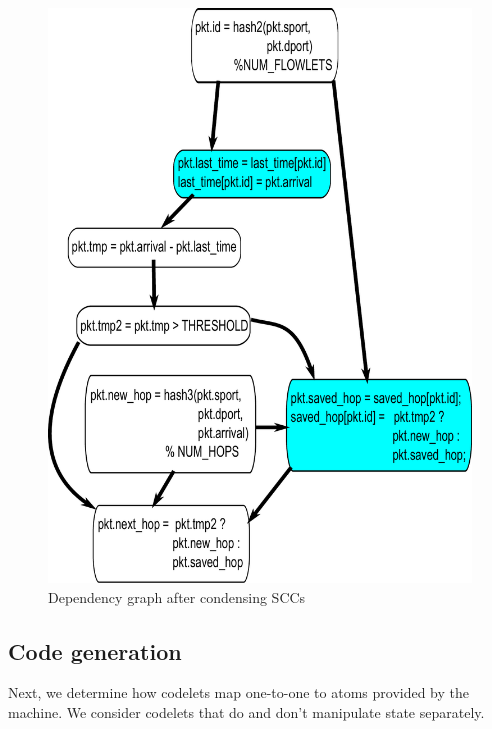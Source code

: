 \begin{figure}[!t]
\begin{minipage}{0.5\textwidth}
\end{minipage}
%
\vrule\quad
%
\begin{minipage}{0.5\textwidth}
\includegraphics[width=\columnwidth]{scc.pdf}
\caption{Dependency graph after condensing SCCs}
\label{fig:partitioning_after}
\end{minipage}
\end{figure}

\subsection{Code generation}
\label{ss:code_gen}
Next, we determine how codelets map one-to-one to atoms provided by the
\absmachine machine. We consider codelets that do and don't manipulate state
separately.
